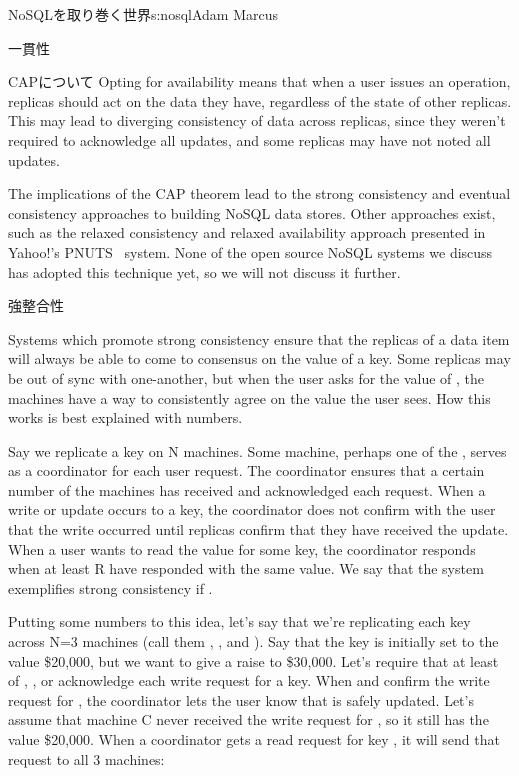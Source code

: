 \begin{aosachapter}{NoSQLを取り巻く世界}{s:nosql}{Adam Marcus}
\begin{aosasect1}{一貫性}
\begin{aosasect2}{CAPについて}
Opting for availability means that when a user issues an operation,
replicas should act on the
data they have, regardless of the state of other replicas.  This may
lead to diverging consistency of data across replicas, since they
weren't required to acknowledge all updates, and some replicas may
have not noted all updates.

The implications of the CAP theorem lead to the strong consistency and
eventual consistency approaches to building NoSQL data stores.  Other
approaches exist, such as the relaxed consistency and relaxed
availability approach presented in Yahoo!'s PNUTS~\cite{bib:pnuts} system.  None of
the open source NoSQL systems we discuss has adopted this technique yet,
so we will not discuss it further.

\end{aosasect2}

\begin{aosasect2}{強整合性}

Systems which promote strong consistency ensure that the replicas of a
data item will always be able to come to consensus on the value of a
key.  Some replicas may be out of sync with one-another, but when the
user asks for the value of , the machines have
a way to consistently agree on the value the user sees.  How this
works is best explained with numbers.

Say we replicate a key on N machines.  Some machine, perhaps one of
the , serves as a coordinator for each user request.  The
coordinator ensures that a certain number of the  machines has
received and acknowledged each request.  When a write or update occurs
to a key, the coordinator does not confirm with the user that the
write occurred until  replicas confirm that they have received
the update.  When a user wants to read the value for some key, the
coordinator responds when at least R have responded with the same
value.  We say that the system exemplifies strong consistency if
.

Putting some numbers to this idea, let's say that we're replicating
each key across N=3 machines (call them , , and
).  Say that the key  is initially set
to the value \$20,000, but we want to give  a raise
to \$30,000.  Let's require that at least  of ,
, or  acknowledge each write request for a key.  When
 and  confirm the write request for , the coordinator lets the user know that
 is safely updated.  Let's assume that machine
C never received the write request for , so it
still has the value \$20,000.  When a coordinator gets a read request
for key , it will send that request to all 3
machines:


\end{aosasect2}
\end{aosasect1}
\end{aosachapter}
